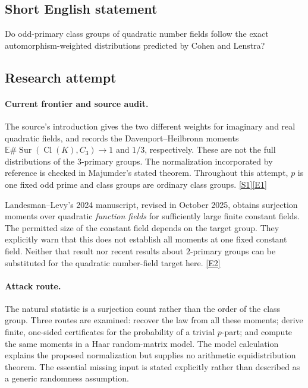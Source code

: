 \documentclass[11pt,a4paper]{article}
\newcommand{\E}{\mathbb{E}}
\newcommand{\sref}[2]{\hyperlink{source:#1:#2}{[S#2]}}
\newcommand{\eref}[2]{\hyperlink{extra:#1:#2}{[E#2]}}
\numberwithin{equation}{section}
\begin{document}
\subsection{Short English statement}
Do odd-primary class groups of quadratic number fields follow the exact automorphism-weighted distributions predicted by Cohen and Lenstra?
\subsection{Research attempt}

\paragraph{Current frontier and source audit.}
The source's introduction gives the two different weights for imaginary
and real quadratic fields, and records the Davenport--Heilbronn moments
$\E\#\operatorname{Sur}(\operatorname{Cl}(K),C_3)\to1$ and $1/3$,
respectively. These are not the full distributions of the $3$-primary
groups. The normalization incorporated by reference is checked in
Majumder's stated theorem. Throughout this attempt, $p$ is one fixed odd
prime and class groups are ordinary class groups. \sref{116}{1}\eref{116}{1}

Landesman--Levy's 2024 manuscript, revised in October 2025, obtains
surjection moments over quadratic \emph{function fields} for sufficiently
large finite constant fields. The permitted size of the constant field
depends on the target group. They explicitly warn that this does not
establish all moments at one fixed constant field. Neither that result
nor recent results about $2$-primary groups can be substituted for the
quadratic number-field target here. \eref{116}{2}

\paragraph{Attack route.}
The natural statistic is a surjection count rather than the order of the
class group. Three routes are examined: recover the law from all these
moments; derive finite, one-sided certificates for the probability of a
trivial $p$-part; and compute the same moments in a Haar random-matrix
model. The model calculation explains the proposed normalization but
supplies no arithmetic equidistribution theorem. The essential missing
input is stated explicitly rather than described as a generic randomness
assumption.
\end{document}

